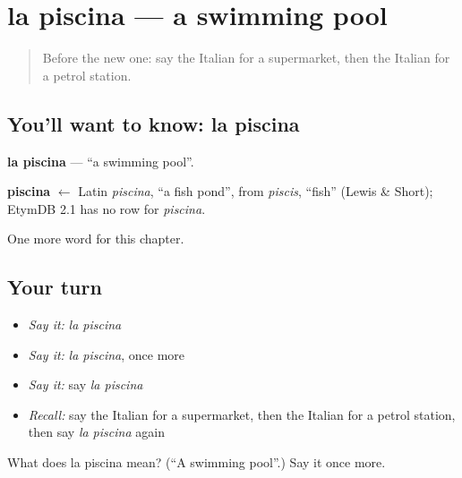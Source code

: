 \section[la piscina]{la piscina — a swimming pool}

\label{lesson:IT-C88-piscina}



\begin{quote}
Before the new one: say the Italian for a supermarket, then the Italian for a petrol station.
\end{quote}

\subsection*{You'll want to know: la piscina}
\textbf{la piscina} — \textquotedblleft{}a swimming pool\textquotedblright{}.

\begin{cousinweb}
\textbf{piscina} $\leftarrow$ Latin \emph{piscina}, \textquotedblleft{}a fish pond\textquotedblright{}, from \emph{piscis}, \textquotedblleft{}fish\textquotedblright{} (Lewis \& Short); EtymDB 2.1 has no row for \emph{piscina}.
\end{cousinweb}

\begin{grammarlens}[title={What you've built}]
One more word for this chapter.
\end{grammarlens}

\subsection*{Your turn}
\begin{itemize}
\raggedright
  \item \emph{Say it:} \emph{la piscina}
  \item \emph{Say it:} \emph{la piscina}, once more
  \item \emph{Say it:} say \emph{la piscina}
  \item \emph{Recall:} say the Italian for a supermarket, then the Italian for a petrol station, then say \emph{la piscina} again
\end{itemize}

\begin{tcolorbox}[breakable,colback=teal!4,colframe=teal!35!black,title={Before you move on}]
What does la piscina mean? (\textquotedblleft{}A swimming pool\textquotedblright{}.) Say it once more.
\end{tcolorbox}
